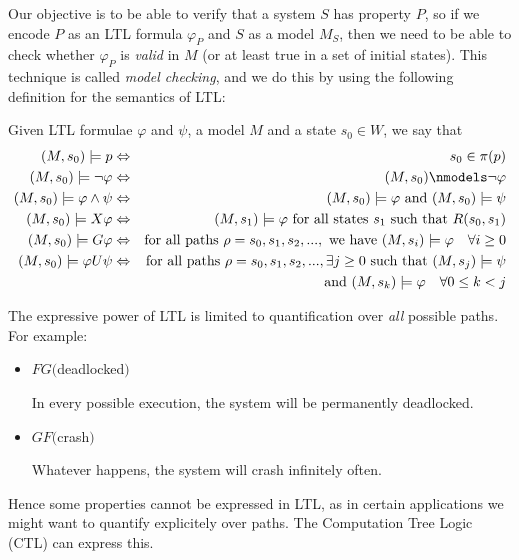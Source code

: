 \documentclass[12]{article}
\newenvironment{definition}[1][Definition]{\begin{trivlist}
\item[\hskip \labelsep {\bfseries #1}]}{\end{trivlist}}
\begin{document}
 Our objective is to be able to verify that a system $S$ has property $P$, so if we encode $P$ as an LTL formula $\varphi_P$ and $S$ as a model $M_S$, then we need to be able to check whether $\varphi_P$ is \textit{valid} in $M$ (or at least true in a set of initial states). This technique is called \textit{model checking}, and we do this by using the following definition for the semantics of LTL:
\label{model_checking}

\begin{definition}
Given LTL formulae $\varphi$ and $\psi$, a model $M$ and a state $s_0 \in W$, we say that
\begin{eqnarray*}
(M, s_0) \models p &\Leftrightarrow& s_0 \in \pi(p) \\  
(M, s_0) \models \lnot \varphi &\Leftrightarrow& (M, s_0) \nmodels \lnot \varphi\\
(M, s_0) \models \varphi \land \psi &\Leftrightarrow& (M, s_0) \models \varphi \mbox{ and  } (M, s_0) \models \psi \\
(M, s_0) \models X\varphi &\Leftrightarrow& (M, s_1) \models \varphi \mbox{  for all states } s_1 \mbox{ such that } R(s_0, s_1)\\
(M, s_0) \models G\varphi &\Leftrightarrow& \mbox{for all paths } \rho = s_0, s_1, s_2, ... , \mbox{ we have } (M, s_i) \models \varphi \quad \forall i \geq 0 \\
(M, s_0) \models \varphi U\psi &\Leftrightarrow& \mbox{for all paths } \rho = s_0, s_1, s_2, ..., \exists j \geq 0 \mbox{ such that }  (M, s_j) \models \psi \\ && \mbox{ and }  (M, s_k) \models \varphi \quad \forall 0 \leq k < j
\end{eqnarray*}

\end{definition}

The expressive power of LTL is limited to quantification over \textit{all} possible paths. For example: 

\begin{itemize}
\item $FG($deadlocked$)$ 

In every possible execution, the system will be permanently deadlocked.

\item $GF($crash$)$

Whatever happens, the system will crash infinitely often.
\end{itemize}

Hence some properties cannot be expressed in LTL, as in certain applications we might want to quantify explicitely over paths. The Computation Tree Logic (CTL) can express this. 
\end{document}
